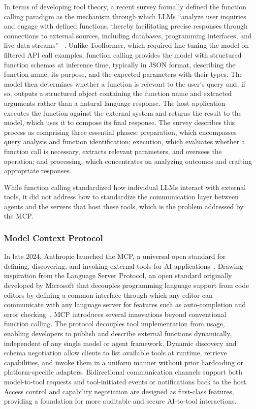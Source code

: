 \documentclass[
english,                 %
bibtex,                  %
includeExtraAbstracts, %
]{kththesis}
\numberwithin{listing}{chapter}
\begin{document}
In terms of developing tool theory, a recent survey formally defined the function calling paradigm as the mechanism through which \glspl{LLM} ``analyze user inquiries and engage with defined functions, thereby facilitating precise responses through connections to external sources, including databases, programming interfaces, and live data streams'' ~\cite{wang_function_2026}. Unlike Toolformer, which required fine-tuning the model on filtered \gls{API} call examples, function calling provides the model with structured function schemas at inference time, typically in \gls{JSON} format, describing the function name, its purpose, and the expected parameters with their types. The model then determines whether a function is relevant to the user's query and, if so, outputs a structured object containing the function name and extracted arguments rather than a natural language response. The host application executes the function against the external system and returns the result to the model, which uses it to compose its final response. The survey describes this process as comprising three essential phases: preparation, which encompasses query analysis and function identification; execution, which evaluates whether a function call is necessary, extracts relevant parameters, and oversees the operation; and processing, which concentrates on analyzing outcomes and crafting appropriate responses.

While function calling standardized how individual \glspl{LLM} interact with external tools, it did not address how to standardize the communication layer between agents and the servers that host these tools, which is the problem addressed by the \gls{MCP}.

\subsubsection{Model Context Protocol}

In late 2024, Anthropic launched the \gls{MCP}, a universal open standard for defining, discovering, and invoking external tools for \gls{AI} applications~\cite{hou_model_2026}. Drawing inspiration from the Language Server Protocol, an open standard originally developed by Microsoft that decouples programming language support from code editors by defining a common interface through which any editor can communicate with any language server for features such as auto-completion and error checking~\cite{gunasinghe_language_2021}, \gls{MCP} introduces several innovations beyond conventional function calling. The protocol decouples tool implementation from usage, enabling developers to publish and describe external functions dynamically, independent of any single model or agent framework. Dynamic discovery and schema negotiation allow clients to list available tools at runtime, retrieve capabilities, and invoke them in a uniform manner without prior hardcoding or platform-specific adapters. Bidirectional communication channels support both model-to-tool requests and tool-initiated events or notifications back to the host. Access control and capability negotiation are designed as first-class features, providing a foundation for more auditable and secure \gls{AI}-to-tool interactions.
\end{document}
